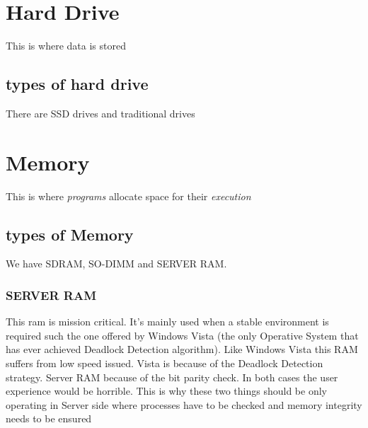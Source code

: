 \documentclass[a4paper,12pt]{article}
\begin{document}

\clearpage

\section{Hard Drive}
This is where data is stored
\subsection{types of hard drive}
There are SSD drives and traditional drives
\clearpage

\section{Memory}

This is where \emph{programs} allocate space for their \emph{execution}

\subsection{types of Memory}

We have SDRAM, SO-DIMM and SERVER RAM.

\subsubsection{SERVER RAM}
This ram is mission critical. It's mainly used when a stable environment is required such the one offered by Windows Vista (the only Operative System that has ever achieved Deadlock Detection algorithm).
Like Windows Vista this RAM suffers from low speed issued. Vista is because of the Deadlock Detection strategy. Server RAM because of the bit parity check. In both cases the user experience would be horrible. This is why these two things should be only operating in Server side where processes have to be checked and memory integrity needs to be ensured
\printindex
\end{document}
